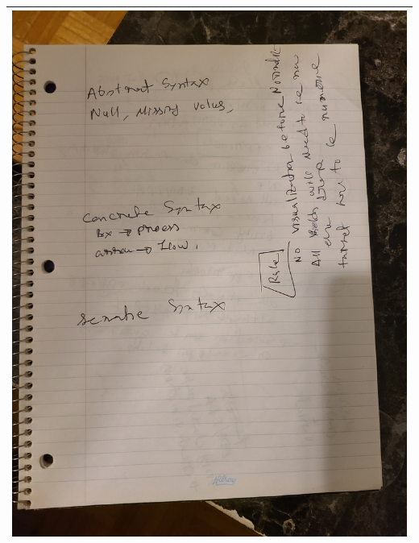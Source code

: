 \begin{tabular}{|c|}
\hline
\includegraphics[scale=0.1, angle = -90]{sketch/3.jpg} \\
\hline

\end{tabular}

